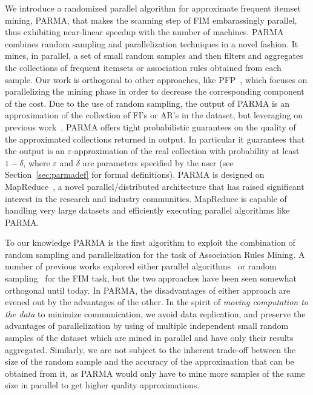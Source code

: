 We introduce a randomized parallel algorithm for approximate frequent itemset
mining, PARMA, that makes the scanning step of FIM embarassingly parallel, thus
exhibiting near-linear speedup with the number of machines.  PARMA combines
random sampling and parallelization techniques in a novel fashion.  It mines, in
parallel, a set of small random samples and then filters and aggregates the
collections of frequent itemsets or association rules obtained from each sample.
Our work is orthogonal to other approaches, like PFP~\cite{LiWZZC08}, which
focuses on parallelizing the mining phase in order to decrease the corresponding
component of the cost. 
%
Due to the use of random sampling, the output of PARMA is an approximation of
the collection of FI's or AR's in the dataset, but leveraging on previous
work~\cite{RiondatoU12}, PARMA offers tight probabilistic guarantees on the
quality of the approximated collections returned in output. In particular it
guarantees that the output is an $\varepsilon$-approximation of the real
collection with probability at least $1-\delta$, where $\varepsilon$ and
$\delta$ are parameters specified by the user (see Section~\ref{sec:parmadef} for
formal definitions). 
PARMA is designed on
MapReduce~\cite{DeanG08}, a novel parallel/distributed architecture that has
raised significant interest in the research and industry communities. MapReduce
is capable of handling very large datasets and efficiently executing parallel
algorithms like PARMA.

To our knowledge PARMA is the first algorithm to exploit the combination of
random sampling and parallelization for the task of Association Rules Mining.  A
number of previous works explored either parallel
algorithms~\cite{BuehrerPTKS07,CongHHP05,EHZaiane06,FangEtAl08,LiuLZT07,OzkuralUA11,JinYA05,Zaki99}
or random
sampling~\cite{Toivonen96,ZakiPLO97,Parthasarathy02,PietracaprinaRUV10,LiG04,RiondatoU12}
for the FIM task, but the two approaches have been seen somewhat orthogonal
until today. In PARMA, the disadvantages of either approach are evened out by
the advantages of the other. In the spirit of \emph{moving computation to the
data} to minimize communication, we avoid data replication, and preserve the
advantages of parallelization by using of multiple independent small random
samples of the dataset which are mined in parallel and have only their results
aggregated. Similarly, we are not subject to the inherent trade-off between
the size of the random sample and the accuracy of the approximation that can be
obtained from it, as PARMA would only have to mine more samples of the same size
in parallel to get higher quality approximations.

